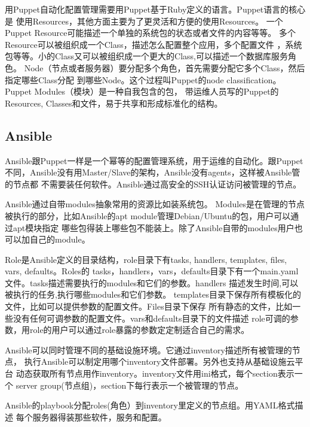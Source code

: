 用Puppet自动化配置管理需要用Puppet基于Ruby定义的语言。Puppet语言的核心是
使用Resources，其他方面主要为了更灵活和方便的使用Resources。
一个Puppet Resource可能描述一个单独的系统包的状态或者文件的内容等等。
多个Resource可以被组织成一个Class，描述怎么配置整个应用，多个配置文件
，系统包等等。小的Class又可以被组织成一个更大的Class,可以描述一个数据库服务角色。
Node（节点或者服务器）要分配多个角色，首先需要分配它多个Class，然后指定哪些Class分配
到哪些Node。这个过程叫Puppet的node classification。Puppet Modules（模块）是一种自我包含的包，
带运维人员写的Puppet的Resources, Classes和文件，易于共享和形成标准化的结构。

\subsection{Ansible}
\label{subsubsec:ansible}
Ansible跟Puppet一样是一个幂等的配置管理系统，用于运维的自动化。跟Puppet不同，Ansible没有用Master/Slave的架构，Ansible没有agents，这样被Ansible管的节点都
不需要装任何软件。Ansible通过高安全的SSH认证访问被管理的节点。

Ansible通过自带modules抽象常用的资源比如装系统包。
Modules是在管理的节点被执行的部分，比如Ansible的apt module管理Debian/Ubuntu的包，用户可以通过apt模块指定
哪些包得装上哪些包不能装上。除了Ansible自带的modules用户也可以加自己的module。

Role是Ansible定义的目录结构，role目录下有tasks, handlers, templates, files, vars, defaults。Roles的
tasks，handlers，vars，defaults目录下有一个main.yaml文件。tasks描述需要执行的modules和它们的参数。handlers
描述发生时间,可以被执行的任务,执行哪些modules和它们参数。
templates目录下保存所有模板化的文件，比如可以提供参数的配置文件。Files目录下保存
所有静态的文件，比如一些没有任何可调参数的配置文件。vars和defaults目录下的文件描述
role可调的参数，用role的用户可以通过role暴露的参数定定制适合自己的需求。

Ansible可以同时管理不同的基础设施环境。它通过inventory描述所有被管理的节点，
执行Ansible可以制定用哪个inventory文件部署。另外也支持从基础设施云平台
动态获取所有节点用作inventory。inventory文件用ini格式，每个section表示一个
server group(节点组)，section下每行表示一个被管理的节点。

Ansible的playbook分配roles(角色）到inventory里定义的节点组。用YAML格式描述
每个服务器得装那些软件，服务和配置。





